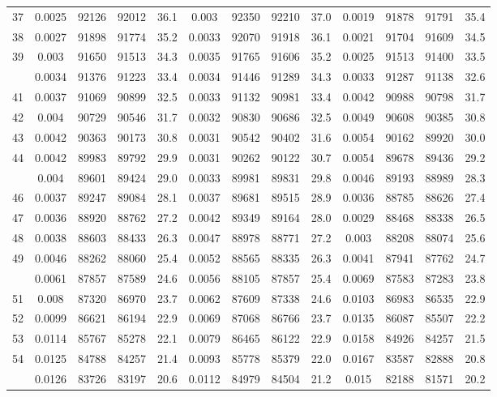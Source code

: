 \documentclass[
  14pt,
]{article}
\begin{document}
\begin{longtable}[t]{lcccccccccccc}
37 & 0.0025 & 92126 & 92012 & 36.1 & 0.003 & 92350 & 92210 & 37.0 & 0.0019 & 91878 & 91791 & 35.4\\
38 & 0.0027 & 91898 & 91774 & 35.2 & 0.0033 & 92070 & 91918 & 36.1 & 0.0021 & 91704 & 91609 & 34.5\\
39 & 0.003 & 91650 & 91513 & 34.3 & 0.0035 & 91765 & 91606 & 35.2 & 0.0025 & 91513 & 91400 & 33.5\\
\addlinespace
40 & 0.0034 & 91376 & 91223 & 33.4 & 0.0034 & 91446 & 91289 & 34.3 & 0.0033 & 91287 & 91138 & 32.6\\
41 & 0.0037 & 91069 & 90899 & 32.5 & 0.0033 & 91132 & 90981 & 33.4 & 0.0042 & 90988 & 90798 & 31.7\\
42 & 0.004 & 90729 & 90546 & 31.7 & 0.0032 & 90830 & 90686 & 32.5 & 0.0049 & 90608 & 90385 & 30.8\\
43 & 0.0042 & 90363 & 90173 & 30.8 & 0.0031 & 90542 & 90402 & 31.6 & 0.0054 & 90162 & 89920 & 30.0\\
44 & 0.0042 & 89983 & 89792 & 29.9 & 0.0031 & 90262 & 90122 & 30.7 & 0.0054 & 89678 & 89436 & 29.2\\
\addlinespace
45 & 0.004 & 89601 & 89424 & 29.0 & 0.0033 & 89981 & 89831 & 29.8 & 0.0046 & 89193 & 88989 & 28.3\\
46 & 0.0037 & 89247 & 89084 & 28.1 & 0.0037 & 89681 & 89515 & 28.9 & 0.0036 & 88785 & 88626 & 27.4\\
47 & 0.0036 & 88920 & 88762 & 27.2 & 0.0042 & 89349 & 89164 & 28.0 & 0.0029 & 88468 & 88338 & 26.5\\
48 & 0.0038 & 88603 & 88433 & 26.3 & 0.0047 & 88978 & 88771 & 27.2 & 0.003 & 88208 & 88074 & 25.6\\
49 & 0.0046 & 88262 & 88060 & 25.4 & 0.0052 & 88565 & 88335 & 26.3 & 0.0041 & 87941 & 87762 & 24.7\\
\addlinespace
50 & 0.0061 & 87857 & 87589 & 24.6 & 0.0056 & 88105 & 87857 & 25.4 & 0.0069 & 87583 & 87283 & 23.8\\
51 & 0.008 & 87320 & 86970 & 23.7 & 0.0062 & 87609 & 87338 & 24.6 & 0.0103 & 86983 & 86535 & 22.9\\
52 & 0.0099 & 86621 & 86194 & 22.9 & 0.0069 & 87068 & 86766 & 23.7 & 0.0135 & 86087 & 85507 & 22.2\\
53 & 0.0114 & 85767 & 85278 & 22.1 & 0.0079 & 86465 & 86122 & 22.9 & 0.0158 & 84926 & 84257 & 21.5\\
54 & 0.0125 & 84788 & 84257 & 21.4 & 0.0093 & 85778 & 85379 & 22.0 & 0.0167 & 83587 & 82888 & 20.8\\
\addlinespace
55 & 0.0126 & 83726 & 83197 & 20.6 & 0.0112 & 84979 & 84504 & 21.2 & 0.015 & 82188 & 81571 & 20.2\\

\end{longtable}
\end{document}

